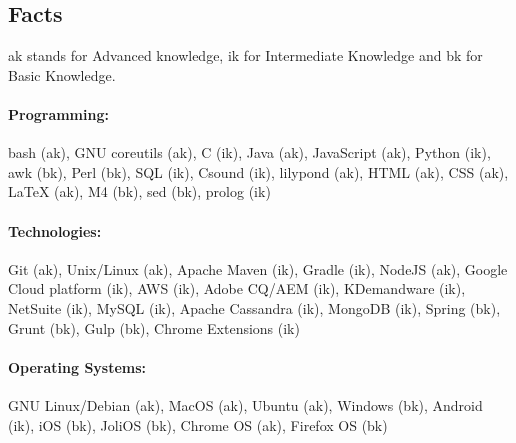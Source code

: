 \subsection{Facts}
ak stands for Advanced knowledge, ik for Intermediate Knowledge and bk for Basic Knowledge.
\paragraph{Programming:}
bash (ak), GNU coreutils (ak), C (ik), Java (ak), JavaScript (ak), Python
(ik), awk (bk),
Perl
(bk), SQL (ik), Csound (ik), lilypond (ak), HTML (ak), CSS (ak), LaTeX
(ak), M4 (bk), sed (bk), prolog (ik)
\paragraph{Technologies:}
Git (ak), Unix/Linux (ak), Apache Maven (ik), Gradle (ik), NodeJS (ak), Google Cloud platform (ik), AWS (ik), Adobe CQ/AEM (ik), KDemandware (ik), NetSuite
(ik), MySQL (ik), Apache Cassandra (ik), MongoDB (ik), Spring (bk), Grunt (bk), Gulp (bk),
Chrome Extensions (ik)
\paragraph{Operating Systems:}
GNU Linux/Debian (ak), MacOS (ak), Ubuntu (ak), Windows (bk), Android (ik),
iOS (bk),
JoliOS (bk), Chrome OS (ak), Firefox OS (bk)

